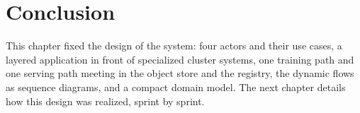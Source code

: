 \section{Conclusion}
This chapter fixed the design of the system: four actors and their use cases,
a layered application in front of specialized cluster systems, one training
path and one serving path meeting in the object store and the registry, the
dynamic flows as sequence diagrams, and a compact domain model. The next
chapter details how this design was realized, sprint by sprint.
